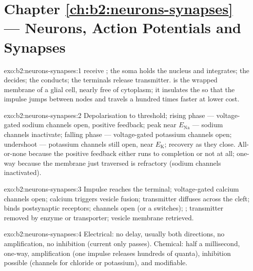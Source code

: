 \section*{Chapter \ref{ch:b2:neurons-synapses} --- Neurons, Action Potentials and Synapses}

\begin{solution}{exo:b2:neurons-synapses:1}
 receive ; the soma holds the nucleus and
integrates; the  decides; the  conducts; the
terminals release transmitter.  is the wrapped membrane of a
glial cell, nearly free of cytoplasm; it insulates the  so that
the impulse jumps between nodes and travels a hundred times faster
at lower cost.
\end{solution}

\begin{solution}{exo:b2:neurons-synapses:2}
Depolarisation to threshold; rising phase --- voltage-gated sodium
channels open, positive feedback; peak near $E_{\mathrm{Na}}$ ---
sodium channels inactivate; falling phase --- voltage-gated potassium
channels open; undershoot --- potassium channels still open, near
$E_{\mathrm K}$; recovery as they close. All-or-none because the
positive feedback either runs to completion or not at all; one-way
because the membrane just traversed is refractory (sodium channels
inactivated).
\end{solution}

\begin{solution}{exo:b2:neurons-synapses:3}
Impulse reaches the terminal; voltage-gated calcium channels open;
calcium triggers vesicle fusion; transmitter diffuses across the
cleft; binds postsynaptic receptors; channels open (or a 
switches); ; transmitter removed by enzyme or
transporter; vesicle membrane retrieved.
\end{solution}

\begin{solution}{exo:b2:neurons-synapses:4}
Electrical: no delay, usually both directions, no amplification, no
inhibition (current only passes). Chemical: half a millisecond,
one-way, amplification (one impulse releases hundreds of quanta),
inhibition possible (channels for chloride or potassium), and
modifiable.
\end{solution}

